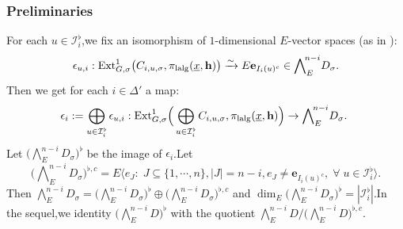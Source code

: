\documentclass[10pt]{article}
\newtheorem{rmk}[thm]{Remark}
\newcommand{\fil}{{\rm Fil}}
\newcommand{\ext}{{\rm Ext}}
\newcommand{\lalg}{{\rm lalg}}
\newcommand{\gr}{{\rm gr}}
\newcommand{\be}{{\mathbf{e}}}
\newcommand{\bh}{{\mathbf{h}}}
\newcommand{\cI}{\mathcal I}
\begin{document}
\subsubsection{Preliminaries}






%





For each $u\in \cI_{i}^{\flat}$,\;we fix an
isomorphism of $1$-dimensional $E$-vector spaces (as in \cite[(43)]{BDcritical25}):
\begin{equation}
	\epsilon_{u,i}:\ext^1_{G,\sigma}\big(C_{i,u,\sigma},\pi_{\lalg}(\underline{x},\bh)\big)\xrightarrow{\sim}E\be_{I_i(u)^c}\in \bigwedge\nolimits_E^{\!n-i}\!D_{\sigma}.
\end{equation}
Then we get for each $i\in\Delta'$ a map:
\begin{equation}\label{dfnforeplisonistar}
	\epsilon_{i}:=\bigoplus_{u\in \cI_{i}^{\flat}}\epsilon_{u,i}:\ext^1_{G,\sigma}\Big(\bigoplus_{u\in \cI_{i}^{\flat}}C_{i,u,\sigma},\pi_{\lalg}(\underline{x},\bh)\Big)\rightarrow\bigwedge\nolimits_E^{\!n-i}\!D_{\sigma}.\;
\end{equation}
Let $\big(\bigwedge_{E}^{\!n-i}\!D_{\sigma}\big)^{\flat}$ be the image of $\epsilon_{i}$.\;Let
\[\big(\bigwedge\nolimits_{E}^{\!n-i}\!D_{\sigma}\big)^{\flat,c}=E\big\langle e_J:\;J\subseteq \{1,\cdots,n\},|J|=n-i,e_J\neq \be_{I_i(u)^c},\;\forall\;u\in \cI_{i}^{\flat}\big\rangle.\]
Then $\bigwedge_E^{n-i}D_{\sigma}=\big(\bigwedge\nolimits_{E}^{\!n-i}\!D_{\sigma}\big)^{\flat}\oplus\big(\bigwedge\nolimits_{E}^{\!n-i}\!D_{\sigma}\big)^{\flat,c}$ and  $\dim_E\big(\bigwedge_{E}^{\!n-i}\!D_{\sigma}\big)^{\flat}=|\cI_{i}^{\flat}|$.\;In the sequel,\;we identity $\big(\bigwedge_{E}^{\!n-i}\!D\big)^{\flat}$ with the quotient $\bigwedge_{E}^{\!n-i}\!D/\big(\bigwedge_{E}^{\!n-i}\!D\big)^{\flat,c}$.\;
\end{document}
